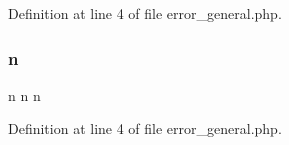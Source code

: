 Definition at line 4 of file error\+\_\+general.\+php.

\mbox{\label{cli_2error__general_8php_ace0fd03cd383f20ce6ea63247a207294}} 
\subsubsection{\texorpdfstring{n}{n}}
{\footnotesize\ttfamily n n n}



Definition at line 4 of file error\+\_\+general.\+php.

